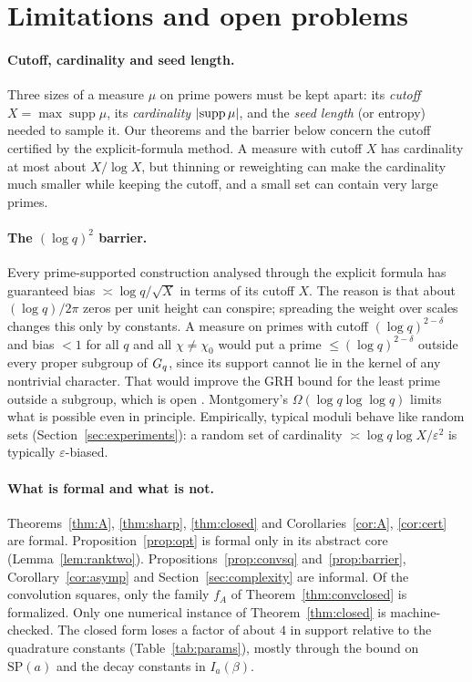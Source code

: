 \section{Limitations and open problems}\label{sec:limits}

\paragraph{Cutoff, cardinality and seed length.}
Three sizes of a measure $\mu$ on prime powers must be kept apart: its \emph{cutoff} $X=\max\operatorname{supp}\mu$, its
\emph{cardinality} $\left\lvert \operatorname{supp}\mu \right\rvert$, and the \emph{seed length} (or entropy) needed to sample it. Our theorems and the
barrier below concern the cutoff certified by the explicit-formula method. A measure with cutoff $X$ has cardinality at most about
$X/\log X$, but thinning or reweighting can make the cardinality much smaller while keeping the cutoff, and a small set can contain
very large primes.

\paragraph{The $(\log q)^2$ barrier.}
Every prime-supported construction analysed through the explicit formula has guaranteed bias
$\asymp\log q/\sqrt X$ in terms of its cutoff $X$. The reason is that about $(\log q)/2\pi$ zeros per unit height can conspire;
spreading the weight over scales changes this only by constants. A measure on primes with cutoff $(\log q)^{2-\delta}$ and bias
$<1$ for all $q$ and all $\chi\ne\chi_0$ would put a prime $\le(\log q)^{2-\delta}$ outside every proper subgroup of $G_q$, since its
support cannot lie in the kernel of any nontrivial character. That would improve the GRH bound for the least prime outside a
subgroup, which is open \cite{lls2015,cmqr2024}. Montgomery's $\Omega(\log q\log\log q)$ \cite{montgomery1971} limits what is
possible even in principle. Empirically, typical moduli behave like random sets (Section~\ref{sec:experiments}): a random set of
cardinality $\asymp\log q\log X/\varepsilon^2$ is typically $\varepsilon$-biased.

\paragraph{What is formal and what is not.}
Theorems~\ref{thm:A}, \ref{thm:sharp}, \ref{thm:closed} and Corollaries~\ref{cor:A}, \ref{cor:cert} are formal.
Proposition~\ref{prop:opt} is formal only in its abstract core (Lemma~\ref{lem:ranktwo}). Propositions~\ref{prop:convsq}
and~\ref{prop:barrier}, Corollary~\ref{cor:asymp} and Section~\ref{sec:complexity} are informal. Of the convolution squares, only the
family $f_A$ of Theorem~\ref{thm:convclosed} is formalized. Only one numerical instance of Theorem~\ref{thm:closed} is
machine-checked. The closed form loses a factor of about $4$ in support relative to the quadrature constants
(Table~\ref{tab:params}), mostly through the bound on $\mathrm{SP}(a)$ and the decay constants in $I_a(\beta)$.

